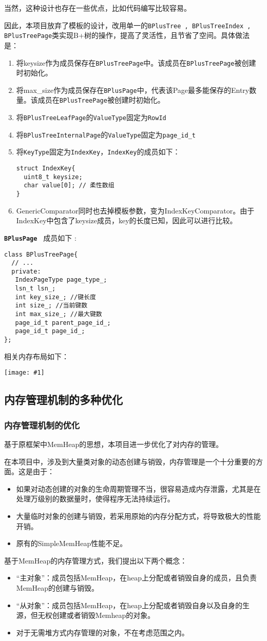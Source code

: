 \documentclass[12pt, a4paper]{article}
\def\c#1{\texttt{#1}}
\def\b#1{\textbf{#1}}
\def\bc#1{\b{\c{#1}}}
\def\ss#1{\subsection{#1}}
\def\sss#1{\subsubsection{#1}}
\def\pid{page\_id\_t\ }
\def\p{\par}
\def\g#1{\begin{center}\texttt{[image: \#1]}\end{center}}
\begin{document}
\p 当然，这种设计也存在一些优点，比如代码编写比较容易。
\p 因此，本项目放弃了模板的设计，改用单一的\c{BPlusTree , BPlusTreeIndex , BPlusTreePage}类实现B+树的操作，提高了灵活性，且节省了空间。具体做法是：
\begin{enumerate}
  \item 将keysize作为成员保存在\c{BPlusTreePage}中。该成员在\c{BPlusTreePage}被创建时初始化。
  \item 将max\_size作为成员保存在\c{BPlusPage}中，代表该Page最多能保存的Entry数量。该成员在\c{BPlusTreePage}被创建时初始化。
  \item 将\c{BPlusTreeLeafPage}的\c{ValueType}固定为\c{RowId}
  \item 将\c{BPlusTreeInternalPage}的\c{ValueType}固定为\c{\pid}
  \item 将\c{KeyType}固定为\c{IndexKey}，\c{IndexKey}的成员如下：\begin{lstlisting}[style=customc]
struct IndexKey{
  uint8_t keysize;
  char value[0]; // 柔性数组
}
  \end{lstlisting}
  \item GenericComparator同时也去掉模板参数，变为IndexKeyComparator。由于IndexKey中包含了keysize成员，key的长度已知，因此可以进行比较。
\end{enumerate}
\p \bc{BPlusPage } 成员如下 :\begin{lstlisting}[style=customc]
class BPlusTreePage{
  // ... 
  private:
   IndexPageType page_type_;
   lsn_t lsn_;
   int key_size_; //键长度
   int size_; //当前键数
   int max_size_; //最大键数
   page_id_t parent_page_id_;
   page_id_t page_id_;
};

\end{lstlisting}
相关内存布局如下：
\g {b_plus_tree_pages.pdf}
\ss{内存管理机制的多种优化}
\sss{内存管理机制的优化}
\p 基于原框架中MemHeap的思想，本项目进一步优化了对内存的管理。
\p 在本项目中，涉及到大量类对象的动态创建与销毁，内存管理是一个十分重要的方面。这是由于：
\begin{itemize}
  \item 如果对动态创建的对象的生命周期管理不当，很容易造成内存泄露，尤其是在处理万级别的数据量时，使得程序无法持续运行。
  \item 大量临时对象的创建与销毁，若采用原始的内存分配方式，将导致极大的性能开销。
  \item 原有的SimpleMemHeap性能不足。
\end{itemize}
\p 基于MemHeap的内存管理方式，我们提出以下两个概念：
\begin{itemize}
  \item “主对象”：成员包括MemHeap，在heap上分配或者销毁自身的成员，且负责MemHeap的创建与销毁。
  \item “从对象”：成员包括MemHeap，在heap上分配或者销毁自身以及自身的生源，但无权创建或者销毁Memheap的对象。
  \item 对于无需堆方式内存管理的对象，不在考虑范围之内。
\end{itemize}
\end{document}
